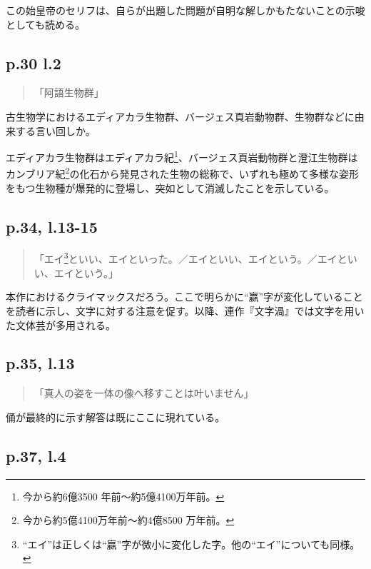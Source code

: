 \documentclass[10pt, a5paper, twoside]{jsarticle}
\theoremstyle{definition}
\begin{document}
		この始皇帝のセリフは、自らが出題した問題が自明な解しかもたないことの示唆としても読める。

		\subsection{p.30 l.2}

		\begin{quote}
			
			「阿語生物群」

		\end{quote}

		古生物学におけるエディアカラ生物群、バージェス頁岩動物群、生物群などに由来する言い回しか。

		エディアカラ生物群はエディアカラ紀\footnote{今から約6億3500
		年前〜約5億4100万年前\cite{ken}。}、バージェス頁岩動物群と澄江生物群はカンブリア紀\footnote{今から約5億4100万年前〜約4億8500
		万年前\cite{ken}。}の化石から発見された生物の総称で、いずれも極めて多様な姿形をもつ生物種が爆発的に登場し、突如として消滅したことを示している。

		\subsection{p.34, l.13-15}

		\begin{quote}

			「エイ\footnote{“エイ”は正しくは“嬴”字が微小に変化した字。他の“エイ”についても同様。}といい、エイといった。／エイといい、エイという。／エイといい、エイという。」

		\end{quote}

		本作におけるクライマックスだろう。ここで明らかに“嬴”字が変化していることを読者に示し、文字に対する注意を促す。以降、連作『文字渦』では文字を用いた文体芸が多用される。

		\subsection{p.35, l.13}

		\begin{quote}
			
			「真人の姿を一体の像へ移すことは叶いません」

		\end{quote}

		俑が最終的に示す解答は既にここに現れている。

		\subsection{p.37, l.4}
\end{document}
